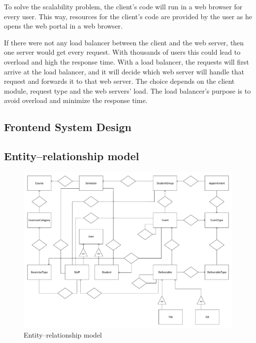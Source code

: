 
To solve the scalability problem, the client's code will run in a web browser for every user. This way, resources for the client's code are provided by the user as he opens the web portal in a web browser.
 

If there were not any load balancer between the client and the web server, then one server would get every request. With thousands of users this could lead to overload and high the response time. With a load balancer, the requests will first arrive at the load balancer, and it will decide which web server will handle that request and forwards it to that web server. The choice depends on the client module, request type and the web servers' load. The load balancer's purpose is to avoid overload and minimize the response time.
 

\subsection{Frontend System Design}

\subsection{Entity–relationship model}
\label{ER-model}

\begin{figure}[!ht]
	\includegraphics[width=\textwidth]{figures/ER.pdf}
	\caption[Entity–relationship model]{Entity–relationship model\footnotemark}
	\label{fig:er}
\end{figure}


